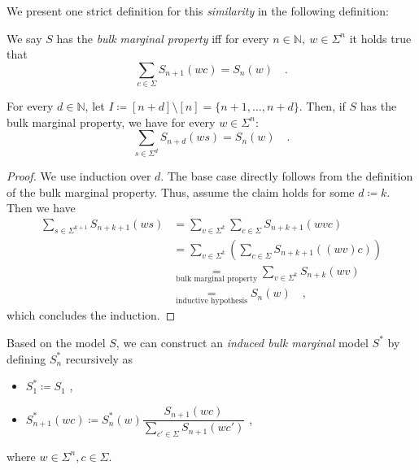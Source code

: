\documentclass[../../main.tex]{subfiles}
\begin{document}
    We present one strict definition for this \emph{similarity} in the following definition:

    \begin{definition}
        We say $S$ has the \emph{bulk marginal property} iff for every $n \in \mathbb{N}, \ w \in \Sigma^{n}$ it holds true that
        \[
            \sum_{c \in \Sigma} S_{n + 1}(wc) = S_n(w) \quad .
        \]
    \end{definition}

    \begin{lemma}
        \label{lemma:random_variables_do_not_change_with_future_models}
        For every $d \in \mathbb{N}$, let $I \coloneqq [n + d] \setminus [n] = \{ n+1, \dots, n + d \}$. Then, if $S$ has the bulk marginal property, we have for every $w \in \Sigma^{n}$:
        \[
            \sum_{s \in \Sigma^d} S_{n + d}(ws) = S_n(w) \quad .
        \]
    \end{lemma}
    \begin{proof}
        We use induction over $d$. The base case directly follows from the definition of the bulk marginal property. Thus, assume the claim holds for some $d \coloneqq k$. Then we have
        \begin{align*}
            \sum_{s \in \Sigma^{k+1}} S_{n + k + 1}(ws) 
            &= \sum_{v \in \Sigma^k} \sum_{c \in \Sigma} S_{n + k + 1}(wvc) \\
            &= \sum_{v \in \Sigma^k} \left( \sum_{c \in \Sigma} S_{n + k + 1}((wv)c) \right) \\
            &\underset{\text{bulk marginal property}}{=} \sum_{v \in \Sigma^k} S_{n+k}(wv) \\
            &\underset{\text{inductive hypothesis}}{=} S_n(w) \quad ,
        \end{align*}
        which concludes the induction.
    \end{proof}

    \begin{definition}
        \label{def:induced_bulk_marginal_model}
        Based on the model $S$, we can construct an \emph{induced bulk marginal} model $S^*$ by defining $S_n^*$ recursively as 
        \begin{itemize}
            \item $S_1^* \coloneqq S_1$ ,
            \item $S_{n + 1}^*(wc) \coloneqq S_n^*(w) \dfrac{S_{n+1}(wc)}{\sum_{c' \in \Sigma} S_{n+1}(wc')}$ ,
        \end{itemize}
        where $w \in \Sigma^n, c \in \Sigma$.
    \end{definition}
\end{document}
